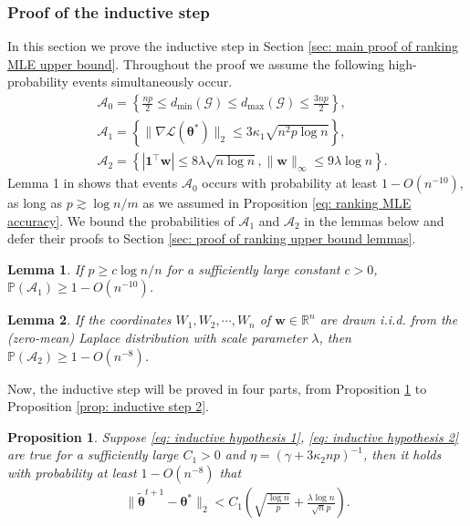 \documentclass[letterpaper,12pt]{article}
\numberwithin{equation}{section}
\theoremstyle{plain}
\numberwithin{Theorem}{section}
\numberwithin{corollary}{section}
\newtheorem{proposition}{Proposition}
\numberwithin{proposition}{section}
\newtheorem{Lemma}{Lemma}
\numberwithin{Lemma}{section}
{
	\theoremstyle{definition}
	\newtheorem{Definition}{Definition}
	\newtheorem{example}{Example}
	\numberwithin{example}{section}
	\newtheorem{fact}{Fact}
	\numberwithin{fact}{section}
	\newtheorem{remark}{Remark}
}
\newcommand{\Pro}{\mathbb{P}}
\newcommand{\1}{\mathbbm{1}}
\def\bth{{\boldsymbol{\theta}}}
\def\R{{\mathbb R}}
\begin{document}
\subsubsection{Proof of the inductive step} \label{sec: proof of induction in ranking MLE upper bound}
In this section we prove the inductive step in Section \ref{sec: main proof of ranking MLE upper bound}. Throughout the proof we assume the following high-probability events simultaneously occur.
\begin{align*}
	&\mathcal A_0 = \left\{\frac{np}{2} \leq d_{\min}(\mathcal G) \leq  d_{\max}(\mathcal G) \leq \frac{3np}{2}\right\},\\
	&\mathcal A_1 = \left\{\|\nabla \mathcal L(\bth^*)\|_2 \leq 3\kappa_1\sqrt{n^2p\log n}\right\}, \\ 
	&\mathcal A_2 = \left\{|\bm1^\top \bm w| \leq 8\lambda\sqrt{n\log n}, \|\bm w\|_\infty \leq 9\lambda\log n \right\}.
\end{align*}
Lemma 1 in \cite{chen2019spectral} shows that events $\mathcal A_0$ occurs with probability at least $1-O(n^{-10})$, as long as $p \gtrsim \log n/m$ as we assumed in Proposition \ref{eq: ranking MLE accuracy}. We bound the probabilities of $\mathcal A_1$ and $\mathcal A_2$ in the lemmas below and defer their proofs to Section \ref{sec: proof of ranking upper bound lemmas}.

\begin{Lemma}\label{lm: gradient norm tail bound}
	If $p \geq c\log n/n$ for a sufficiently large constant $c > 0$, $\Pro(\mathcal A_1) \geq 1 - O(n^{-10})$.
\end{Lemma}

\begin{Lemma}\label{lm: Laplace tail bound}
	If the coordinates $W_1, W_2, \cdots, W_n$ of $\bm w \in \R^n$ are drawn i.i.d. from the (zero-mean) Laplace distribution with scale parameter $\lambda$, then $\Pro(\mathcal A_2) \geq 1 - O(n^{-8})$.
\end{Lemma}

Now, the inductive step will be proved in four parts, from Proposition \ref{prop: inductive step 1} to Proposition \ref{prop: inductive step 2}.

\begin{proposition}\label{prop: inductive step 1}
	Suppose \eqref{eq: inductive hypothesis 1}, \eqref{eq: inductive hypothesis 2} are true for a sufficiently large $C_1 > 0$ and $\eta = (\gamma + 3\kappa_2 np)^{-1}$, then it holds with probability at least $1 - O(n^{-8})$ that
	\begin{align}
		\|\widetilde\bth^{t+1} - \bth^*\|_2 < C_1\left(\sqrt{\frac{\log n}{p}} + \frac{\lambda\log n}{\sqrt{n}p}\right). \label{eq: inductive step 1}
	\end{align}
\end{proposition}
\end{document}
